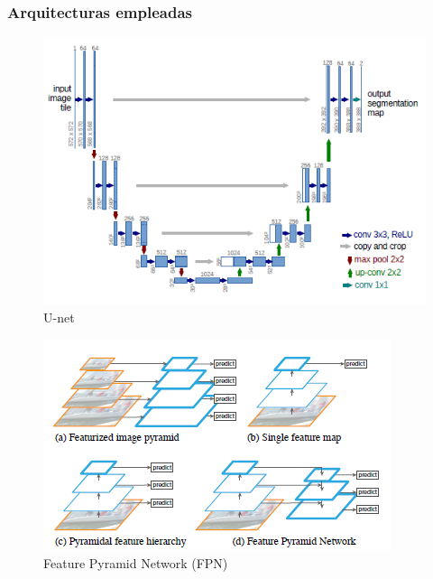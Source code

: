 \begin{frame}[allowframebreaks]
\frametitle{Arquitecturas empleadas}

\begin{figure}[h!]
    \centering
    \includegraphics[scale=0.5]{img/section_05/unet-architecture.png}
    \caption{U-net \cite{DBLP:journals/corr/RonnebergerFB15}}
    \label{fig:unet-architecture}
\end{figure}


\begin{figure}[h!]
    \centering
    \includegraphics[scale=0.5]{img/section_05/fpn-architecture.png}
    \caption{Feature Pyramid Network (FPN) \cite{DBLP:journals/corr/LinDGHHB16}}
    \label{fig:fpn-architecture}
\end{figure}


\end{frame}
